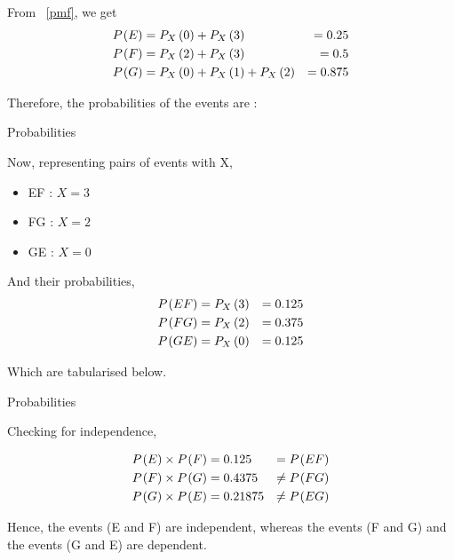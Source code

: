 \documentclass[journal,12pt,twocolumn]{IEEEtran}
\begin{document}
	From ~\ref{pmf}, we get
	\begin{align}
		P_{}\left(E\right) &= P_{X}\left(0\right) + P_{X}\left(3\right) &= 0.25\\
		P_{}\left(F\right) &= P_{X}\left(2\right) + P_{X}\left(3\right) &= 0.5\\
		P_{}\left(G\right) &= P_{X}\left(0\right) + P_{X}\left(1\right) + P_{X}\left(2\right) &= 0.875
	\end{align}
	
	Therefore, the probabilities of the events are :
	
	\begin{table}[h!]
	
		\caption{Probabilities}
		
		
		
			\label{table}
	
	\end{table}
	
	Now, representing pairs of events with X,
	
	\begin{itemize}
	
		\item EF : $X = 3$
		
		\item FG : $X = 2$
		
		\item GE : $X = 0$
		
	\end{itemize}
	
	And their probabilities,
	\begin{align}
		P_{}\left(EF\right) &= P_{X}\left(3\right) &= 0.125 \\
		P_{}\left(FG\right) &= P_{X}\left(2\right) &= 0.375 \\
		P_{}\left(GE\right) &= P_{X}\left(0\right) &= 0.125
	\end{align}
	
	Which are tabularised below.
	
	\begin{table}[h!]
	
		\caption{Probabilities}
		
		
		
			\label{table2}
	
	\end{table}

	\newpage
	Checking for independence,
	
	\begin{align}
		P_{}\left(E\right) \times P_{}\left(F\right) &= 0.125 &= P_{}\left(EF\right)\\
		P_{}\left(F\right) \times P_{}\left(G\right) &= 0.4375 &\neq P_{}\left(FG\right)\\
		P_{}\left(G\right) \times P_{}\left(E\right) &= 0.21875 &\neq P_{}\left(EG\right)
	\end{align}
	
	Hence, the events (E and F) are independent, whereas the events (F and G) and the events (G and E) are dependent.
				
\end{document}
